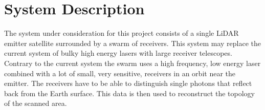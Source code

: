 \section{System Description}
\label{dsePPSystemDescription}
The system under consideration for this project consists of a single LiDAR emitter satellite surrounded by a swarm of receivers. This system may replace the current system of bulky high energy lasers with large receiver telescopes. Contrary to the current system the swarm uses a high frequency, low energy laser combined with a lot of small, very sensitive, receivers in an orbit near the emitter. The receivers have to be able to distinguish single photons that reflect back from the Earth surface. This data is then used to reconstruct the topology of the scanned area.